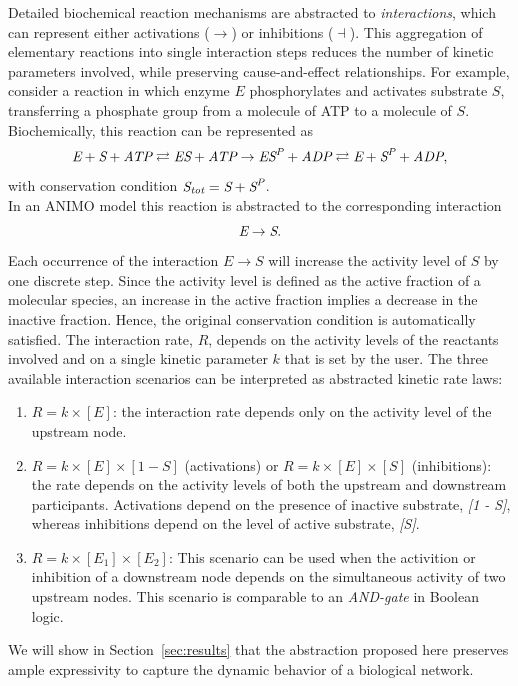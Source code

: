 Detailed biochemical reaction mechanisms are abstracted to \emph{interactions}, which can 
represent either activations ($\rightarrow$) or inhibitions ($\dashv$). 
This aggregation of elementary reactions into single interaction steps reduces the number of kinetic 
parameters involved, while preserving cause-and-effect relationships.
For example, consider a reaction in which enzyme $E$ phosphorylates and activates substrate $S$, 
transferring a phosphate group from a molecule of ATP to a molecule of $S$. Biochemically, this reaction 
can be represented as
$$
\mbox{\it E} + \mbox{\it S} + \mbox{\it ATP} \rightleftarrows \mbox{\it ES} + \mbox{\it ATP} \rightarrow \mbox{\it ES}^{\mbox{\scriptsize \it P}} + \mbox{\it ADP} \rightleftarrows \mbox{\it E} + \mbox{\it S}^{\mbox{\scriptsize\it P}} + \mbox{\it ADP},
$$
with conservation condition $\mbox{\it S}_{\mbox{\scriptsize\it tot}} = \mbox{\it S} + \mbox{\it S}^{\mbox{\scriptsize\it P}}$.\\
In an ANIMO model this reaction is abstracted to the corresponding interaction
$$
\mbox{\it E} \rightarrow \mbox{\it S}.
$$
Each occurrence of the interaction $E \rightarrow S$ will increase the activity level of $S$ by one discrete step. 
Since the activity level is defined as the active fraction of a molecular species, an increase in the active fraction
implies a decrease in the inactive fraction. Hence, the original conservation condition is automatically  
satisfied.
The interaction rate, $R$, depends on the activity levels of the reactants involved and on a single kinetic
parameter $k$ that is set by the user. 
The three available interaction scenarios can be interpreted as abstracted kinetic rate laws:
\begin{enumerate}
  \item $R = k \times [E]$: the interaction rate depends only on the activity level of the upstream node.
  \item $R = k \times [E] \times [1 - S]$ (activations) or $R = k \times [E] \times [S]$ (inhibitions): the rate 
  depends on the activity levels of both the upstream and downstream participants. Activations depend on the 
  presence of inactive substrate, \emph{[1 - S]}, whereas inhibitions depend on the level of active substrate,
  \emph{[S]}.
  \item $R = k \times [E_1] \times [E_2]$: This scenario can be used when the activition or inhibition
  of a downstream node depends on the simultaneous activity of two upstream nodes. This scenario is comparable to an
  \emph{AND-gate} in Boolean logic.
\end{enumerate}
We will show in Section~\ref{sec:results} that the abstraction proposed here preserves ample
expressivity to capture the dynamic behavior of a biological network. 


